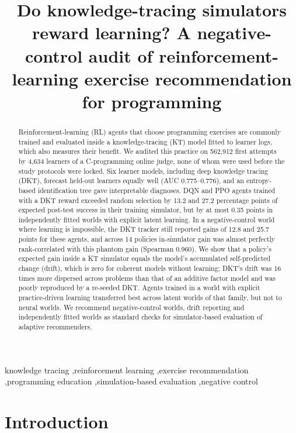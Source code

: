 \documentclass[a4paper,preprint,12pt,authoryear]{elsarticle}
\begin{document}
\begin{frontmatter}

\title{Do knowledge-tracing simulators reward learning? A negative-control audit of reinforcement-learning exercise recommendation for programming}

\begin{abstract}
Reinforcement-learning (RL) agents that choose programming exercises are commonly trained and evaluated inside a knowledge-tracing (KT) model fitted to learner logs, which also measures their benefit. We audited this practice on 562,912 first attempts by 4,634 learners of a C-programming online judge, none of whom were used before the study protocols were locked. Six learner models, including deep knowledge tracing (DKT), forecast held-out learners equally well (AUC 0.775--0.776), and an entropy-based identification tree gave interpretable diagnoses. DQN and PPO agents trained with a DKT reward exceeded random selection by 13.2 and 27.2 percentage points of expected post-test success in their training simulator, but by at most 0.35 points in independently fitted worlds with explicit latent learning. In a negative-control world where learning is impossible, the DKT tracker still reported gains of 12.8 and 25.7 points for these agents, and across 14 policies in-simulator gain was almost perfectly rank-correlated with this phantom gain (Spearman 0.960). We show that a policy's expected gain inside a KT simulator equals the model's accumulated self-predicted change (drift), which is zero for coherent models without learning; DKT's drift was 16 times more dispersed across problems than that of an additive factor model and was poorly reproduced by a re-seeded DKT. Agents trained in a world with explicit practice-driven learning transferred best across latent worlds of that family, but not to neural worlds. We recommend negative-control worlds, drift reporting and independently fitted worlds as standard checks for simulator-based evaluation of adaptive recommenders.
\end{abstract}

\begin{keyword}
knowledge tracing \sep reinforcement learning \sep exercise recommendation \sep programming education \sep simulation-based evaluation \sep negative control
\end{keyword}

\end{frontmatter}

\section{Introduction}\label{sec:intro}
\end{document}
